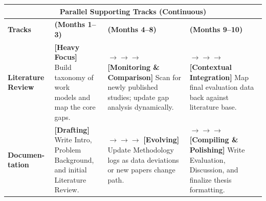 \documentclass[a4paper, 12pt]{article}
\begin{document}
\begin{landscape}
\begin{tabularx}{\linewidth}{|p{1.5cm}|X|X|X|}
\multicolumn{4}{|c|}{\cellcolor{headerblue}\textbf{Parallel Supporting Tracks (Continuous)}} \\
\hline
 
\rowcolor{headerblue}
\textbf{Tracks} & \textbf{(Months 1--3)} & \textbf{(Months 4--8)} & \textbf{(Months 9--10)} \\
\hline
 
\textbf{Literature Review} &
\makecell[l]{\textbf{[Heavy Focus]}\\Build taxonomy of work\\models and map the core gaps.} &
\makecell[l]{$\rightarrow\!\rightarrow\!\rightarrow$ \textbf{[Monitoring \& Comparison]}\\Scan for newly published studies;\\update gap analysis dynamically.} &
\makecell[l]{$\rightarrow\!\rightarrow\!\rightarrow$ \textbf{[Contextual Integration]}\\Map final evaluation data\\back against literature base.} \\
\hline
 
\textbf{Documen-tation} &
\makecell[l]{\textbf{[Drafting]}\\Write Intro, Problem Background,\\and initial Literature Review.} &
\makecell[l]{$\rightarrow\!\rightarrow\!\rightarrow$ \textbf{[Evolving]}\\Update Methodology logs as\\data deviations or new papers\\change path.} &
\makecell[l]{$\rightarrow\!\rightarrow\!\rightarrow$ \textbf{[Compiling \& Polishing]}\\Write Evaluation, Discussion,\\and finalize thesis formatting.} \\
\hline
 
\end{tabularx}
 
\end{landscape}
 



\clearpage

\printbibliography

\clearpage
\end{document}
